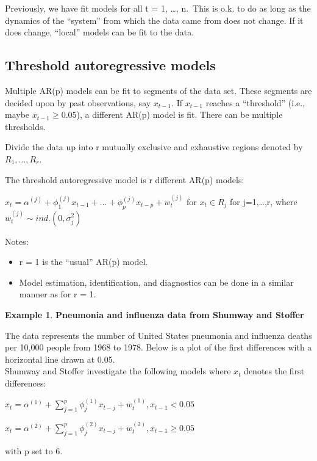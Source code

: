 \documentclass[
]{book}
\providecommand{\tightlist}{%
  \setlength{\itemsep}{0pt}\setlength{\parskip}{0pt}}
\theoremstyle{definition}
\theoremstyle{definition}
\newtheorem{example}{Example}[chapter]
\theoremstyle{definition}
\theoremstyle{definition}
\theoremstyle{remark}
\begin{document}
Previously, we have fit models for all t = 1, \ldots, n.~This is o.k. to do as long as the dynamics of the ``system'' from which the data came from does not change. If it does change, ``local'' models can be fit to the data.

\hypertarget{threshold-autoregressive-models}{%
\subsection{Threshold autoregressive models}\label{threshold-autoregressive-models}}

Multiple AR(p) models can be fit to segments of the data set. These segments are decided upon by past observations, say \(x_{t-1}\). If \(x_{t-1}\) reaches a ``threshold'' (i.e., maybe \(x_{t-1} \ge 0.05\)), a different AR(p) model is fit. There can be multiple thresholds.

Divide the data up into r mutually exclusive and exhaustive regions denoted by \(R_1,…,R_r\).

The threshold autoregressive model is r different AR(p) models:

\(x_t=\alpha^{(j)}+\phi_1^{(j)}x_{t-1}+...+\phi_p^{(j)}x_{t-p}+w^{(j)}_t\) for \(x_t\in R_j\) for j=1,\ldots,r, where \(w_t^{(j)}\sim ind.(0, \sigma^2_j)\)

Notes:

\begin{itemize}
\tightlist
\item
  r = 1 is the ``usual'' AR(p) model.
\item
  Model estimation, identification, and diagnostics can be done in a similar manner as for r = 1.
\end{itemize}

\begin{example}
\textbf{Pneumonia and influenza data from Shumway and Stoffer}

The data represents the number of United States pneumonia and influenza deaths per 10,000 people from 1968 to 1978. Below is a plot of the first differences with a horizontal line drawn at 0.05.\\
Shumway and Stoffer investigate the following models where \(x_t\) denotes the first differences:

\(x_t=\alpha^{(1)}+\sum_{j=1}^{p}\phi^{(1)}_jx_{t-j}+w^{(1)}_t, x_{t-1}<0.05\)

\(x_t=\alpha^{(2)}+\sum_{j=1}^{p}\phi_j^{(2)}x_{t-j}+w_t^{(2)}, x_{t-1}\ge 0.05\)

with p set to 6.
\end{example}
\end{document}

